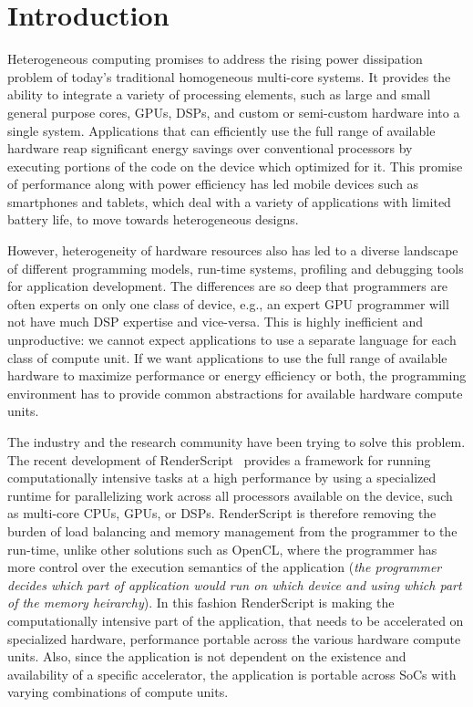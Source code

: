 \section*{Introduction}

Heterogeneous computing promises to address the rising power dissipation problem
of today's traditional homogeneous multi-core
systems. It provides the ability to integrate a variety of processing elements,
such as large and small general purpose cores, GPUs, DSPs, and custom or
semi-custom hardware into a single system. Applications that can efficiently use
the full range of available hardware reap significant energy
savings over conventional processors by executing portions of the code on the
device which optimized for it. This promise of performance along with power efficiency
has led mobile devices such as smartphones
and tablets, which deal with a variety of applications with limited battery
life, to move towards heterogeneous designs.

However, heterogeneity of hardware resources also has led to a diverse landscape
of different programming models, run-time systems, profiling and debugging tools
for application development. The differences are so deep that programmers are
often experts on only one class of device, e.g., an expert GPU programmer will
not have much DSP expertise and vice-versa. This is highly inefficient and
unproductive: we cannot expect applications to use a separate language for each
class of compute unit. If we want applications to use the full range of
available hardware to maximize performance or energy efficiency or both, the
programming environment has to provide common abstractions for available
hardware compute units.

The industry and the research community have been trying to solve this problem.
The recent development of RenderScript~\cite{wiki:RenderScript, RenderScript}
provides a framework for running computationally intensive tasks at a high
performance by using a specialized runtime for parallelizing work across all
processors available on the device, such as multi-core CPUs, GPUs, or DSPs.
RenderScript is therefore removing the burden of load balancing and memory
management from the programmer to the run-time, unlike other solutions such as
OpenCL, where the programmer has more control over the execution semantics of
the application ({\em the programmer decides which part of application would run
on which device and using which part of the memory heirarchy}).  In this fashion
RenderScript is making the computationally intensive part of the application,
that needs to be accelerated on specialized hardware, performance portable
across the various hardware compute units. Also, since the application is not
dependent on the existence and availability of a specific accelerator, the
application is portable across SoCs with varying combinations of compute units.

